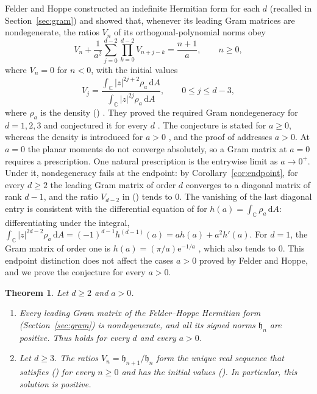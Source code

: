 \documentclass[twoside,10pt]{article}
\numberwithin{equation}{section}
\theoremstyle{slbody}
\newtheorem{theorem}{Theorem}[section]
\theoremstyle{remark}
\newcommand{\C}{\mathbb C}
\newcommand{\dd}{\,\mathrm d}
\newcommand{\e}{\mathrm e}
\newcommand{\fh}{\mathfrak h}
\renewcommand{\eqref}[1]{%
  \textup{{\normalfont(\oldstylenums{\ref{#1}}}\normalfont)}}
\begin{document}
Felder and Hoppe \cite{FelderHoppe2025} constructed an indefinite
Hermitian form for each \(d\) (recalled in Section~\ref{sec:gram}) and
showed that, whenever its leading Gram matrices are nondegenerate, the
ratios \(V_n\) of its orthogonal-polynomial norms obey
\begin{equation}
V_n+\frac1{a^2}\sum_{j=0}^{d-2}
\prod_{k=0}^{d-2}V_{n+j-k}=\frac{n+1}{a},
\qquad n\geq0,
\label{eq:FH-recurrence}
\end{equation}
where \(V_n=0\) for \(n<0\), with the initial values
\begin{equation}
V_j=\frac{\int_\C|z|^{2j+2}\rho_a\dd A}{\int_\C|z|^{2j}\rho_a\dd A},
\qquad 0\leq j\leq d-3,
\label{eq:FH-initial}
\end{equation}
where \(\rho_a\) is the density \eqref{eq:density}
\cite[equation~(3.3) and the display after it]{FelderHoppe2025}.  They
proved the required Gram nondegeneracy for \(d=1,2,3\) and conjectured
it for every \(d\) \cite[Conjecture~3.6 and Theorem~3.7]{FelderHoppe2025}.
The conjecture is stated for \(a\geq0\), whereas the density is
introduced for \(a>0\) \cite[Section~3.1]{FelderHoppe2025}, and the
proof of \cite[Theorem~3.7]{FelderHoppe2025} addresses \(a>0\).  At
\(a=0\) the planar moments do not converge absolutely, so a Gram matrix
at \(a=0\) requires a prescription.  One natural prescription is the
entrywise limit as \(a\to0^+\).  Under it, nondegeneracy fails at the
endpoint: by Corollary~\ref{cor:endpoint}, for every \(d\geq2\) the
leading Gram matrix of order \(d\) converges to a diagonal matrix of
rank \(d-1\), and the ratio \(V_{d-2}\) in \eqref{eq:FH-recurrence}
tends to \(0\).  The vanishing of the last diagonal entry is consistent
with the differential equation of \cite[equation~(3.5)]{FelderHoppe2025}
for \(h(a)=\int_\C\rho_a\dd A\): differentiating under the integral,
\(\int_\C|z|^{2d-2}\rho_a\dd A=(-1)^{d-1}h^{(d-1)}(a)=ah(a)+a^2h'(a)\).
For \(d=1\), the Gram matrix of order one is
\(h(a)=(\pi/a)\e^{-1/a}\) \cite[Section~4]{FelderHoppe2025}, which also
tends to \(0\).  This endpoint distinction does not affect the cases
\(a>0\) proved by Felder and Hoppe, and we prove the conjecture for
every \(a>0\).

\begin{theorem}\label{thm:main}
Let \(d\geq2\) and \(a>0\).
\begin{enumerate}
\item[\textup{(i)}] Every leading Gram matrix of the Felder--Hoppe
Hermitian form \textup{(Section~\ref{sec:gram})} is nondegenerate, and
all its signed norms \(\fh_n\) are positive.  Thus
\cite[Conjecture~3.6]{FelderHoppe2025} holds for every \(d\) and every
\(a>0\).
\item[\textup{(ii)}] Let \(d\geq3\).  The ratios
\(V_n=\fh_{n+1}/\fh_n\) form the unique real sequence that satisfies
\eqref{eq:FH-recurrence} for every \(n\geq0\) and has the initial values
\eqref{eq:FH-initial}.  In particular, this solution is positive.
\end{enumerate}
\end{theorem}
\end{document}
